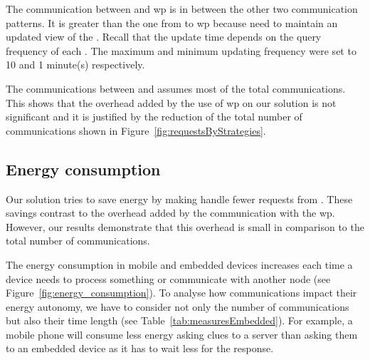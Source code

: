 The communication between \consumers{} and \ac{wp} is in between the other two communication patterns.
It is greater than the one from \providers{} to \ac{wp} because \consumers{} need to maintain an updated view of the \Space{}.
Recall that the update time depends on the query frequency of each \consumer{}.
The maximum and minimum updating frequency were set to 10 and 1 minute(s) respectively.

The communications between \consumers{} and \providers{} assumes most of the total communications.
This shows that the overhead added by the use of \ac{wp} on our solution is not significant and it is justified by the reduction of the total number of communications shown in Figure~\ref{fig:requestsByStrategies}.





\subsection{Energy consumption}
\label{sec:energyConsumption}
Our solution tries to save energy by making \providers{} handle fewer requests from \consumers{}.
These savings contrast to the overhead added by the communication with the \ac{wp}.
However, our results demonstrate that this overhead is small in comparison to the total number of communications.

The energy consumption in mobile and embedded devices increases each time a device needs to process something or communicate with another node (see Figure~\ref{fig:energy_consumption}).
To analyse how communications impact their energy autonomy, we have to consider not only the number of communications but also their time length (see Table~\ref{tab:measuresEmbedded}).
For example, a mobile phone will consume less energy asking clues to a server than asking them to an embedded device as it has to wait less for the response.





